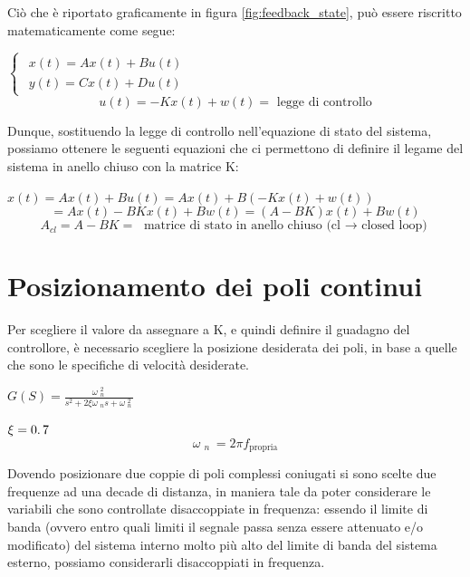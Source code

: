 Ciò che è riportato graficamente in figura \ref{fig:feedback_state}, può essere riscritto matematicamente come segue:
\begin{center}
	$
	\begin{cases}
	\begin{array}{c}
	x\left(t\right)=Ax{\left(t\right)}+Bu\left(t\right)\\
	y{\left(t\right)}=Cx{\left(t\right)}+Du\left(t\right)
	\end{array}
	\end{cases}
	$
	$$
	u{\left(t\right)}=-Kx{\left(t\right)}+w{\left(t\right)}	= \text{ legge di controllo}
	$$
\end{center}

\newpage
Dunque, sostituendo la legge di controllo nell'equazione di stato del sistema, possiamo ottenere le seguenti equazioni che ci permettono di definire il legame del sistema in anello chiuso con la matrice K:
\begin{center}
	$
	x{\left(t\right)}=Ax{\left(t\right)}+Bu{\left(t\right)}=Ax{\left(t\right)}+B{\left(-Kx{\left(t\right)}+w{\left(t\right)}\right)}
	$
	$$
	=Ax{\left(t\right)}-BKx{\left(t\right)}+Bw\left(t\right)={\left(A-BK\right)}x{\left(t\right)}+Bw{\left(t\right)}
	$$
	$$
	A_{cl} =A-BK = \text{ matrice di stato in anello chiuso (cl $\rightarrow$ closed loop)}
	$$
\end{center}

\section{Posizionamento dei poli continui}
Per scegliere il valore da assegnare a K, e quindi definire il guadagno del controllore, è necessario scegliere la posizione desiderata dei poli, in base a quelle che sono le specifiche di velocità desiderate.

\begin{center}
	$
	G{\left(S\right)}=\frac{\omega {\;}_n^{2\;} }{s^2 +2\xi \omega {\;}_n s+\omega {\;}_n^{2\;} }
	$
\end{center}

\begin{center}
	$
	\xi =0\ldotp 7
	$
	$$
	\omega {\;}_{n\;}=2 \pi f_{\mathrm{propria}}
	$$
\end{center}

Dovendo posizionare due coppie di poli complessi coniugati si sono scelte due frequenze ad una decade di distanza, in maniera tale da poter considerare le variabili che sono controllate disaccoppiate in frequenza: essendo il limite di banda (ovvero entro quali limiti il segnale passa senza essere attenuato e/o modificato) del sistema interno molto più alto del limite di banda del sistema esterno, possiamo considerarli disaccoppiati in frequenza.

